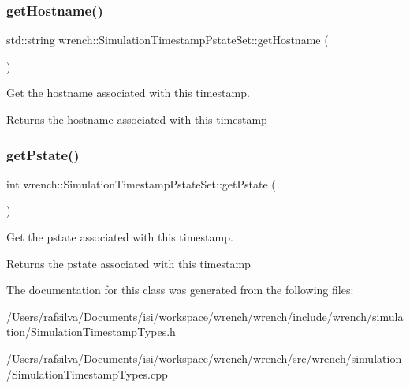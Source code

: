 \subsubsection{\texorpdfstring{get\+Hostname()}{getHostname()}}
{\footnotesize\ttfamily std\+::string wrench\+::\+Simulation\+Timestamp\+Pstate\+Set\+::get\+Hostname (\begin{DoxyParamCaption}{ }\end{DoxyParamCaption})}



Get the hostname associated with this timestamp. 

\begin{DoxyReturn}{Returns}
the hostname associated with this timestamp 
\end{DoxyReturn}
\mbox{\label{classwrench_1_1_simulation_timestamp_pstate_set_aa16b326fe7c60ec75ed6468d94183c0d}} 
\subsubsection{\texorpdfstring{get\+Pstate()}{getPstate()}}
{\footnotesize\ttfamily int wrench\+::\+Simulation\+Timestamp\+Pstate\+Set\+::get\+Pstate (\begin{DoxyParamCaption}{ }\end{DoxyParamCaption})}



Get the pstate associated with this timestamp. 

\begin{DoxyReturn}{Returns}
the pstate associated with this timestamp 
\end{DoxyReturn}


The documentation for this class was generated from the following files\+:\begin{DoxyCompactItemize}
\item 
/\+Users/rafsilva/\+Documents/isi/workspace/wrench/wrench/include/wrench/simulation/Simulation\+Timestamp\+Types.\+h\item 
/\+Users/rafsilva/\+Documents/isi/workspace/wrench/wrench/src/wrench/simulation/Simulation\+Timestamp\+Types.\+cpp\end{DoxyCompactItemize}
